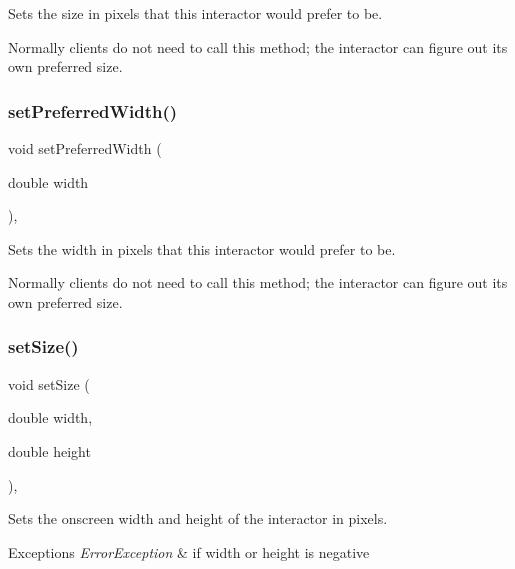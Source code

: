 Sets the size in pixels that this interactor would prefer to be. 

Normally clients do not need to call this method; the interactor can figure out its own preferred size. \mbox{\label{classsgl_1_1GInteractor_a3db429ab2fa52efd187eec0ed8cdd9f2}} 
\subsubsection{\texorpdfstring{set\+Preferred\+Width()}{setPreferredWidth()}}
{\footnotesize\ttfamily void set\+Preferred\+Width (\begin{DoxyParamCaption}\item[{double}]{width }\end{DoxyParamCaption})\hspace{0.3cm}{\ttfamily [virtual]}, {\ttfamily [inherited]}}



Sets the width in pixels that this interactor would prefer to be. 

Normally clients do not need to call this method; the interactor can figure out its own preferred size. \mbox{\label{classsgl_1_1GLabel_a8ba9af72c23f52d4b93096a13a11f150}} 
\subsubsection{\texorpdfstring{set\+Size()}{setSize()}\hspace{0.1cm}{\footnotesize\ttfamily [1/2]}}
{\footnotesize\ttfamily void set\+Size (\begin{DoxyParamCaption}\item[{double}]{width,  }\item[{double}]{height }\end{DoxyParamCaption})\hspace{0.3cm}{\ttfamily [override]}, {\ttfamily [virtual]}}



Sets the onscreen width and height of the interactor in pixels. 


\begin{DoxyExceptions}{Exceptions}
{\em Error\+Exception} & if width or height is negative \\
\hline
\end{DoxyExceptions}


